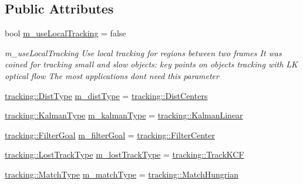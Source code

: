 \subsection*{Public Attributes}
\begin{DoxyCompactItemize}
\item 
bool \mbox{\hyperlink{struct_tracker_settings_a64f4e2f0b2eaeae47316690ab5a5e620}{m\+\_\+use\+Local\+Tracking}} = false
\begin{DoxyCompactList}\small\item\em m\+\_\+use\+Local\+Tracking Use local tracking for regions between two frames It was coined for tracking small and slow objects\+: key points on objects tracking with LK optical flow The most applications don\textquotesingle{}t need this parameter \end{DoxyCompactList}\item 
\mbox{\hyperlink{namespacetracking_a55743c5e18b9b228c4ba2587260b2502}{tracking\+::\+Dist\+Type}} \mbox{\hyperlink{struct_tracker_settings_a2633bd68c2d482a666a5d4bba580cca0}{m\+\_\+dist\+Type}} = \mbox{\hyperlink{namespacetracking_a55743c5e18b9b228c4ba2587260b2502a30176bdc0b4f965c6812767a2fa52e1e}{tracking\+::\+Dist\+Centers}}
\item 
\mbox{\hyperlink{namespacetracking_a83f2c4d58ea2737f7d6296dce3eb722a}{tracking\+::\+Kalman\+Type}} \mbox{\hyperlink{struct_tracker_settings_a3856a809067135c1c3f2d3c61fc4d6b7}{m\+\_\+kalman\+Type}} = \mbox{\hyperlink{namespacetracking_a83f2c4d58ea2737f7d6296dce3eb722aa889eca583e371386c92e05814797a885}{tracking\+::\+Kalman\+Linear}}
\item 
\mbox{\hyperlink{namespacetracking_a9b3e7d16c86cd8b781ab214e396b0ebf}{tracking\+::\+Filter\+Goal}} \mbox{\hyperlink{struct_tracker_settings_afd6c83aa8b0eaa4f131f45852a0b89e4}{m\+\_\+filter\+Goal}} = \mbox{\hyperlink{namespacetracking_a9b3e7d16c86cd8b781ab214e396b0ebfafac394783c1196957768400bc53ba491}{tracking\+::\+Filter\+Center}}
\item 
\mbox{\hyperlink{namespacetracking_a5377d69122ad915004ef68a518d22be3}{tracking\+::\+Lost\+Track\+Type}} \mbox{\hyperlink{struct_tracker_settings_a61a59f1c5bcc2ee76cef1b174d4bb8a4}{m\+\_\+lost\+Track\+Type}} = \mbox{\hyperlink{namespacetracking_a5377d69122ad915004ef68a518d22be3a9bba8e4377e562caa976576d47c5eb2e}{tracking\+::\+Track\+K\+CF}}
\item 
\mbox{\hyperlink{namespacetracking_a491e50c9261ab820965d871a217d4f13}{tracking\+::\+Match\+Type}} \mbox{\hyperlink{struct_tracker_settings_a94a05cbda5eeeac7fa1b64baf9c703f5}{m\+\_\+match\+Type}} = \mbox{\hyperlink{namespacetracking_a491e50c9261ab820965d871a217d4f13a8c97315e46df8c0716a9538655fc967d}{tracking\+::\+Match\+Hungrian}}

\end{DoxyCompactItemize}
